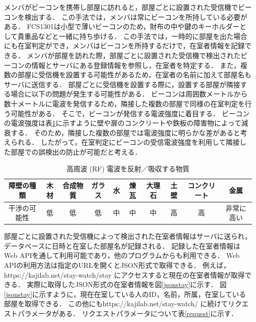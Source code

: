 メンバがビーコンを携帯し部屋に訪れると，部屋ごとに設置された受信機でビーコンを検出する．
この手法では，メンバは常にビーコンを所持している必要がある．
FCS1301は小型で薄いビーコンのため，財布の中や鍵のキーホルダーとして貴重品などと一緒に持ち歩ける．
この手法では，一時的に部屋を出た場合にも在室判定ができ，メンバはビーコンを所持するだけで，在室者情報を記録できる．
メンバが部屋を訪れた際，部屋ごとに設置された受信機で検出されたビーコンの情報とサーバにある登録情報を参照し，在室者を特定する．
また，複数の部屋に受信機を設置する可能性があるため，在室者の名前に加えて部屋名もサーバに送信する．
部屋ごとに受信機を設置する際に，設置する部屋が隣接する場合に以下の問題が発生する可能性がある．
ビーコンは周囲数メートルから数十メートルに電波を発信するため，隣接した複数の部屋で同様の在室判定を行う可能性がある．
そこで，ビーコンが発信する電波強度に着目する．
ビーコンの電波強度は表\ref{tb:rf}に示すように壁や扉のコンクリートや鉄板の障害物によって減衰する\cite{barrier}．
そのため，隣接した複数の部屋では電波強度に明らかな差があると考えられる．
したがって，在室判定にビーコンの受信電波強度を利用して隣接した部屋での誤検出の防止が可能だと考える．

\begin{table}[H]
  \begin{center}
    \caption{高周波 (RF) 電波を反射／吸収する物質}
    \label{tb:rf}
    \begin{tabular}{|c||c|c|c|c|c|c|c|c|c|} \hline
      障壁の種類  & 木材 & 合成物質 & ガラス & 水 & 煉瓦 & 大理石 & 土壁 & コンクリート & 金属    \\ \hline
      干渉の可能性 & 低  & 低    & 低   & 中 & 中  & 中   & 高  & 高      & 非常に高い \\ \hline
    \end{tabular}
  \end{center}
\end{table}

部屋ごとに設置された受信機によって検出された在室者情報はサーバに送られ，データベースに日時と在室した部屋名が記録される．
記録した在室者情報はWeb APIを通して利用可能であり，他のプログラムからも利用できる．
Web APIの利用方法は指定のURLを開くとJSON形式\cite{json}で取得できる．
例えば，https://kajilab.net/stay-watch/stay にアクセスすると現在の在室者情報が取得できる．
実際に取得したJSON形式の在室者情報を図\ref{jsonstay}に示す．
図\ref{jsonstay}に示すように，現在在室している人のID，名前，所属，在室している部屋を取得できる．
この他にもhttps://kajilab.net/stay-watch/ に続けてリクエストパラメータがある．
リクエストパラメータについて表\ref{request}に示す．

